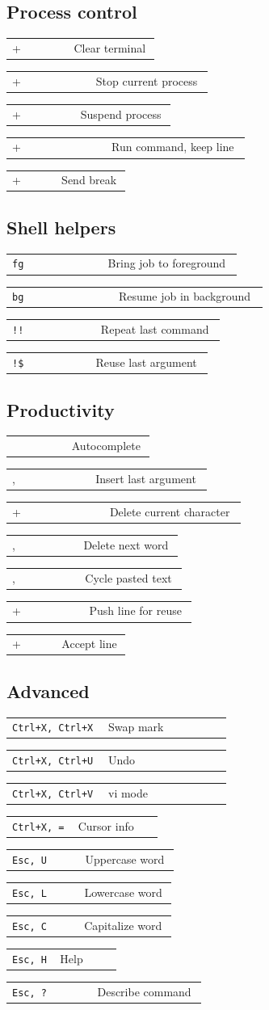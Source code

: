 \documentclass[10pt]{article}
\makeatletter
\newcommand{\key}[1]{%
  \fbox{\raisebox{0pt}[1.05em][0.15em]{\scriptsize\texttt{#1}}}\hspace{0.4em}%
}
\newcommand{\shortcut}[2]{%
  \noindent
  \begin{tabular*}{\linewidth}{@{}p{0.40\linewidth}@{\hspace{0.3em}}p{0.56\linewidth}@{}}
  #1 & #2 \\
  \end{tabular*}
  \vspace{0.25em}
}
\newcommand{\shortcuttext}[2]{%
  \noindent
  \begin{tabular*}{\linewidth}{@{}p{0.42\linewidth}@{\hspace{0.2em}}p{0.54\linewidth}@{}}
  \texttt{#1} & #2 \\
  \end{tabular*}
  \vspace{0.12em}
}
\makeatother
\begin{document}
\begin{multicols}{3}
\vspace{0.5em}

\subsection*{Process control}

\shortcut{\key{Ctrl} + \key{L}}{Clear terminal}
\shortcut{\key{Ctrl} + \key{C}}{Stop current process}
\shortcut{\key{Ctrl} + \key{Z}}{Suspend process}
\shortcut{\key{Ctrl} + \key{O}}{Run command, keep line}
\shortcut{\key{Ctrl} + \key{G}}{Send break}

\vspace{0.5em}

\subsection*{Shell helpers}

\shortcut{\texttt{fg}}{Bring job to foreground}
\shortcut{\texttt{bg}}{Resume job in background}
\shortcut{\texttt{!!}}{Repeat last command}
\shortcut{\texttt{!\$}}{Reuse last argument}

\columnbreak

\subsection*{Productivity}

\shortcut{\key{Tab}}{Autocomplete}
\shortcut{\key{Esc}, \key{.}}{Insert last argument}
\shortcut{\key{Ctrl} + \key{D}}{Delete current character}
\shortcut{\key{Esc}, \key{D}}{Delete next word}
\shortcut{\key{Esc}, \key{Y}}{Cycle pasted text}
\shortcut{\key{Ctrl} + \key{Q}}{Push line for reuse}
\shortcut{\key{Ctrl} + \key{J}}{Accept line}

\subsection*{Advanced}

\shortcuttext{Ctrl+X, Ctrl+X}{Swap mark}
\shortcuttext{Ctrl+X, Ctrl+U}{Undo}
\shortcuttext{Ctrl+X, Ctrl+V}{vi mode}
\shortcuttext{Ctrl+X, =}{Cursor info}
\shortcuttext{Esc, U}{Uppercase word}
\shortcuttext{Esc, L}{Lowercase word}
\shortcuttext{Esc, C}{Capitalize word}
\shortcuttext{Esc, H}{Help}
\shortcuttext{Esc, ?}{Describe command}
\end{multicols}
\end{document}
